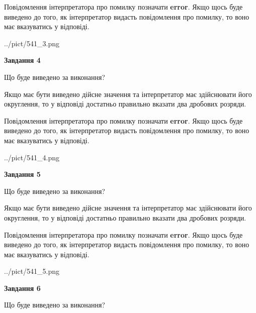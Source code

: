 \documentclass[12pt, ukrainian]{article}
\begin{document}
{\begin {Large}
Повідомлення інтерпретатора про помилку позначати \textbf{error}.
Якщо щось буде виведено до того, як інтерпретатор видасть повідомлення про помилку, 
то воно має вказуватись у відповіді. \par

\begin{center}
	{../pict/541_3.png}
\end{center}
\newpage

{\begin {center}\textbf{Завдання 4}\end {center}}\par
Що буде виведено за виконання? \par

Якщо має бути виведено дійсне значення та інтерпретатор має здійснювати його округлення, 
то у відповіді достатньо правильно вказати два дробових розряди.

Повідомлення інтерпретатора про помилку позначати \textbf{error}.
Якщо щось буде виведено до того, як інтерпретатор видасть повідомлення про помилку, 
то воно має вказуватись у відповіді. \par

\begin{center}
	{../pict/541_4.png}
\end{center}
\newpage

{\begin {center}\textbf{Завдання 5}\end {center}}\par
Що буде виведено за виконання? \par

Якщо має бути виведено дійсне значення та інтерпретатор має здійснювати його округлення, 
то у відповіді достатньо правильно вказати два дробових розряди.

Повідомлення інтерпретатора про помилку позначати \textbf{error}.
Якщо щось буде виведено до того, як інтерпретатор видасть повідомлення про помилку, 
то воно має вказуватись у відповіді. \par

\begin{center}
	{../pict/541_5.png}
\end{center}
\newpage

{\begin {center}\textbf{Завдання 6}\end {center}}\par
Що буде виведено за виконання? \par


\end{Large}}
\end{document}
